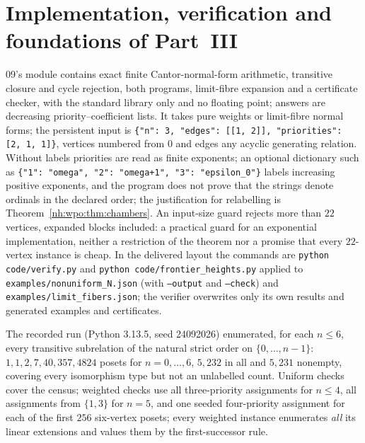 \documentclass[11pt,a4paper]{article}
\theoremstyle{definition}
\theoremstyle{remark}
\begin{document}
\section{Implementation, verification and foundations of Part~III}
\label{nh:wpo:sec:verification}

09's module  contains exact finite
Cantor-normal-form arithmetic, transitive closure and cycle rejection, both
programs, limit-fibre expansion and a certificate checker, with the standard
library only and no floating point; answers are decreasing
priority--coefficient lists. It takes pure weights or limit-fibre normal forms;
the persistent input is \texttt{\{"n": 3, "edges": [[1, 2]], "priorities": [2, 1, 1]\}},
vertices numbered from $0$ and edges any acyclic generating relation. Without
labels priorities are read as finite exponents; an optional dictionary such as
\texttt{\{"1": "omega", "2": "omega+1", "3": "epsilon\_0"\}} labels increasing
positive exponents, and the program does not prove that the strings denote
ordinals in the declared order; the justification for relabelling is
Theorem~\ref{nh:wpo:thm:chambers}. An input-size guard rejects more than $22$
vertices, expanded blocks included: a practical guard for an exponential
implementation, neither a restriction of the theorem nor a promise that every
$22$-vertex instance is cheap. In the delivered layout the commands are
\texttt{python code/verify.py} and \texttt{python code/frontier\_heights.py}
applied to \texttt{examples/nonuniform\_N.json} (with \texttt{--output} and
\texttt{--check}) and \texttt{examples/limit\_fibers.json}; the verifier
overwrites only its own results and generated examples and certificates.

The recorded run (Python 3.13.5, seed 24092026) enumerated, for each $n\le6$,
every transitive subrelation of the natural strict order on $\{0,\dots,n-1\}$:
$1,1,2,7,40,357,4824$ posets for $n=0,\dots,6$, $5{,}232$ in all and $5{,}231$
nonempty, covering every isomorphism type but not an unlabelled count. Uniform
checks cover the census; weighted checks use all three-priority assignments for
$n\le4$, all assignments from $\{1,3\}$ for $n=5$, and one seeded four-priority
assignment for each of the first $256$ six-vertex posets; every weighted instance
enumerates \emph{all} its linear extensions and values them by the first-successor
rule.
\end{document}
